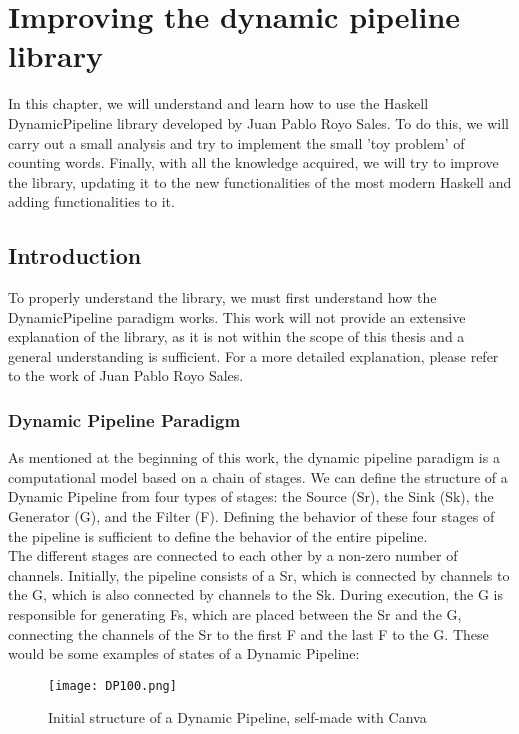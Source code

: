 \chapter{Improving the dynamic pipeline library} \label{IDPL}
In this chapter, we will understand and learn how to use the Haskell DynamicPipeline library developed by Juan Pablo Royo Sales.
To do this, we will carry out a small analysis and try to implement the small 'toy problem' of counting words.
Finally, with all the knowledge acquired, we will try to improve the library, updating it to the new functionalities of the most modern Haskell and adding functionalities to it. 
\section{Introduction}
To properly understand the library, we must first understand how the DynamicPipeline paradigm works.
This work will not provide an extensive explanation of the library, as it is not within the scope of this thesis and a general understanding is sufficient.
For a more detailed explanation, please refer to the work of Juan Pablo Royo Sales.
\subsection*{Dynamic Pipeline Paradigm}
As mentioned at the beginning of this work, the dynamic pipeline paradigm is a computational model based on a chain of stages.
We can define the structure of a Dynamic Pipeline from four types of stages: the Source (Sr), the Sink (Sk), the Generator (G), and the Filter (F).
Defining the behavior of these four stages of the pipeline is sufficient to define the behavior of the entire pipeline. \\

The different stages are connected to each other by a non-zero number of channels.
Initially, the pipeline consists of a Sr, which is connected by channels to the G, which is also connected by channels to the Sk.
During execution, the G is responsible for generating Fs, which are placed between the Sr and the G, connecting the channels of the Sr to the first F and the last F to the G.
These would be some examples of states of a Dynamic Pipeline:

\begin{figure}[H]
    \centering
    \texttt{[image: DP100.png]}
    \caption{Initial structure of a Dynamic Pipeline, self-made with Canva}
    \label{fig:DP100}
\end{figure}

